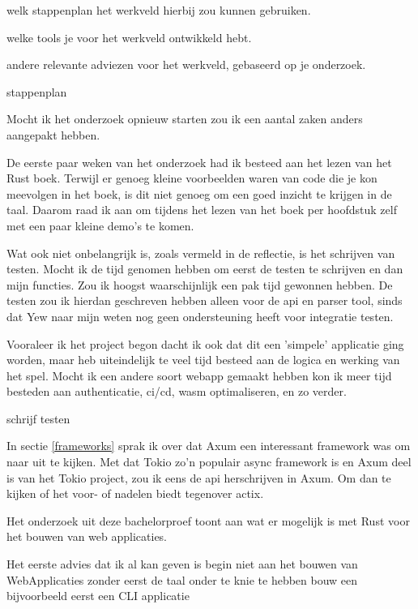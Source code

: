welk stappenplan het werkveld hierbij zou kunnen gebruiken.

welke tools je voor het werkveld ontwikkeld hebt.

andere relevante adviezen voor het werkveld, gebaseerd op je onderzoek.


stappenplan

Mocht ik het onderzoek opnieuw starten zou ik een aantal zaken anders aangepakt hebben.

De eerste paar weken van het onderzoek had ik besteed aan het lezen van het Rust boek. Terwijl er
genoeg kleine voorbeelden waren van code die je kon meevolgen in het boek, is dit niet genoeg om
een goed inzicht te krijgen in de taal. Daarom raad ik aan om tijdens het lezen van het boek per
hoofdstuk zelf met een paar kleine demo's te komen.

Wat ook niet onbelangrijk is, zoals vermeld in de reflectie, is het schrijven van testen. Mocht ik
de tijd genomen hebben om eerst de testen te schrijven en dan mijn functies. Zou ik hoogst
waarschijnlijk een pak tijd gewonnen hebben. De testen zou ik hierdan geschreven hebben alleen voor
de api en parser tool, sinds dat Yew naar mijn weten nog geen ondersteuning heeft voor integratie
testen.

Vooraleer ik het project begon dacht ik ook dat dit een 'simpele' applicatie ging worden, maar heb
uiteindelijk te veel tijd besteed aan de logica en werking van het spel. Mocht ik een andere soort
webapp gemaakt hebben kon ik meer tijd besteden aan authenticatie, ci/cd, wasm optimaliseren, en zo
verder.

schrijf testen


In sectie \ref{frameworks} sprak ik over dat Axum een interessant framework was om naar uit te
kijken. Met dat Tokio zo'n populair async framework is en Axum deel is van het Tokio project, zou ik
eens de api herschrijven in Axum. Om dan te kijken of het voor- of nadelen biedt tegenover actix.



Het onderzoek uit deze bachelorproef toont aan wat er mogelijk is met Rust voor het bouwen van web
applicaties.

Het eerste advies dat ik al kan geven is begin niet aan het bouwen van WebApplicaties zonder eerst
de taal onder te knie te hebben
bouw een bijvoorbeeld eerst een CLI applicatie
